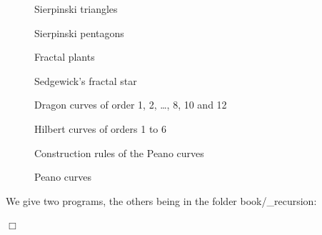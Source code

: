 \begin{figure}[htbp]
 \caption{Sierpinski triangles}\label{fig:trisierp}
\end{figure}
\begin{figure}[htbp]
 \caption{Sierpinski pentagons}\label{fig:pensierp}
\end{figure}
\begin{figure}[htbp]
 \caption{Fractal plants}\label{fig:vege}
\end{figure}
\begin{figure}[htbp]
 \caption{Sedgewick's fractal star}\label{fig:sedgew}
\end{figure}
\begin{figure}[htbp]
 \caption{Dragon curves of order 1, 2, \ldots, 8, 10 and 12}\label{fig:dragon}
\end{figure}
\begin{figure}[htbp]
 \caption{Hilbert curves of orders 1 to 6}\label{fig:hilbert}
\end{figure}
\begin{figure}[htbp]
 \caption{Construction rules of the Peano curves}\label{fig:conspeano}
\end{figure}
\begin{figure}[htbp]
 \caption{Peano curves}\label{fig:peano}
\end{figure}
\pagebreak[3]
\begin{corriges}{
\renewcommand{\carrenoir}{\hspace{-4mm}\rule{1.5mm}{1.5mm}\hspace{2.5mm}}
We give two programs, the others being in the folder {\idt book/\_recursion}:
\label{prog:SegmentDeVonKoch}

\pagebreak[3]

\renewcommand{\carrenoir}{}
\noindent $\Box$}\end{corriges}
\clearpage

